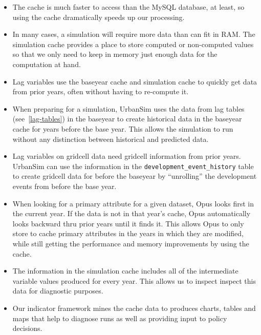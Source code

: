 \begin{itemize}
  \item The cache is much faster to access than the MySQL \mysqlindex database, at least,
  so using the cache dramatically speeds up our processing.
  \item In many cases, a simulation will require more data than can fit in RAM.
  The simulation cache \simulationcacheindex provides a place to store computed
  or non-computed values so that we only need to keep in memory just enough
  data for the computation at hand. 
  \item Lag variables use the baseyear cache and simulation
  cache \simulationcacheindex to quickly get data from prior years, often
  without having to re-compute it.
  \item When preparing for a simulation, UrbanSim uses the data from lag tables
  (see~\ref{lag-tables}) in the baseyear to create historical data in the
  baseyear cache for years before the base year.  This
  allows the simulation to run without any distinction between historical and
  predicted data.
  \item Lag variables on gridcell data need gridcell information from prior
  years.  UrbanSim can use the information in the
  \verb|development_event_history| table to create gridcell data for before the
  baseyear by ``unrolling'' the development events from before the base year.
  \item When looking for a primary attribute \primaryattributesindex for a given dataset, Opus
  looks first in the current year.  If the data is not in that year's cache,
  Opus automatically looks backward thru prior years until it finds it.  This
  allows Opus to only store to cache primary attributes \primaryattributesindex in the years in
  which they are modified, while still getting the performance and memory
  improvements by using the cache. 
  \item The information in the simulation cache \simulationcacheindex includes all
  of the intermediate variable values produced for every year.  This allows us
  to inspect inspect this data for diagnostic purposes.
  \item Our indicator framework mines the cache data to produces charts, tables
  and maps that help to diagnose runs as well as providing input to policy
  decisions.
\end{itemize}


